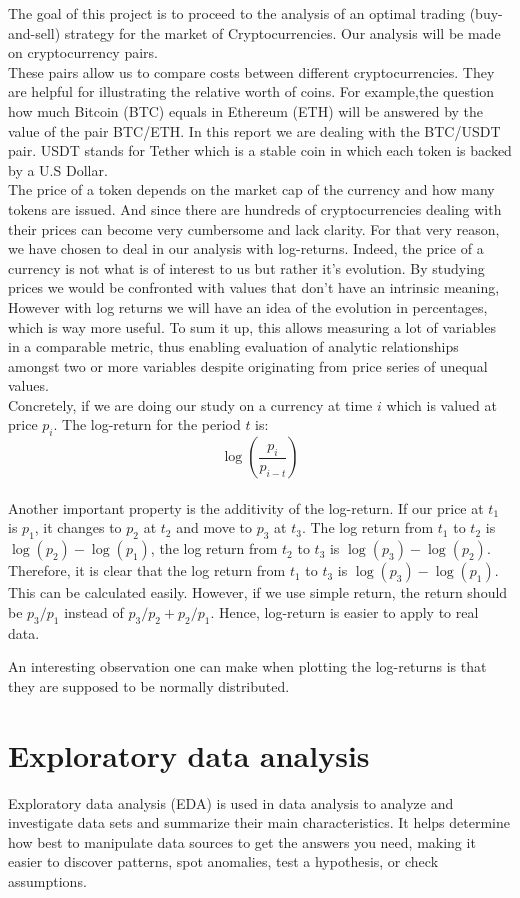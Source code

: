 \documentclass[twoside]{report}
\begin{document}
\begin{spacing}{1}
The goal of this project is to proceed to the analysis of an optimal trading (buy-and-sell) strategy for the market of Cryptocurrencies. Our analysis will be made on cryptocurrency pairs.\\
These pairs allow us to compare costs between different cryptocurrencies. They are helpful for illustrating the relative worth of coins. For example,the question how much Bitcoin (BTC) equals in Ethereum (ETH) will be answered by the value of the pair BTC/ETH.
In this report we are dealing with the BTC/USDT pair. USDT stands for Tether which is a stable coin in which each token is backed by a U.S Dollar.\\
The price of a token depends on the market cap of the currency and how many tokens are issued. And since there are hundreds of cryptocurrencies dealing with their prices can become very cumbersome and lack clarity. For that very reason, we have chosen to deal in our analysis with log-returns.
Indeed, the price of a currency is not what is of interest to us but rather it's evolution. By studying prices we would be confronted with values that don't have an intrinsic meaning, However with log returns we will have an idea of the evolution in percentages, which is way more useful. To sum it up, this allows measuring a lot of variables in a comparable metric, thus enabling evaluation of analytic relationships amongst two or more variables despite originating from price series of unequal values. \\
Concretely, if we are doing our study on a currency at time $i$ which is valued at price $p_i$. The log-return for the period $t$ is:
$$\log\left(\frac{p_i}{p_{i-t}}\right)$$\\

Another important property is the additivity of the log-return. If our price at $t_1$ is $p_1$, it changes to $p_2$ at $t_2$ and move to $p_3$ at $t_3$. The log return from $t_1 $ to $t_2$ is $\log (p_2) - \log (p_1)$, the log return from $t_2 $ to $t_3$ is $\log (p_3) - \log (p_2)$. Therefore, it is clear that the log return from $t_1 $ to $t_3$ is $\log (p_3) - \log (p_1)$. This can be calculated easily. However, if we use simple return, the return should be $p_3/p_1$ instead of $p_3/p_2 + p_2/p_1$. Hence, log-return is easier to apply to real data.

 An interesting observation one can make when plotting the log-returns is that they are supposed to be normally distributed.
 
 
 \section{Exploratory data analysis}
Exploratory data analysis (EDA) is used in data analysis to analyze and investigate data sets and summarize their main characteristics. It helps determine how best to manipulate data sources to get the answers you need, making it easier to discover patterns, spot anomalies, test a hypothesis, or check assumptions.


\end{spacing}
\end{document}
